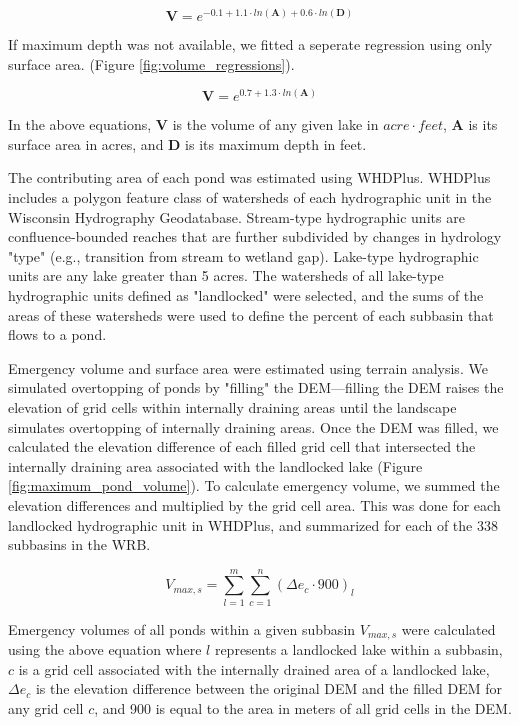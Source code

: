 \begin{equation}
\bm{V} = e^{-0.1 + 1.1 \cdot ln(\bm{A}) + 0.6 \cdot ln(\bm{D})} 
\end{equation}

If maximum depth was not available, we fitted a seperate regression using only surface area. (Figure \ref{fig:volume_regressions}).

\begin{equation}
\bm{V} = e^{0.7 + 1.3 \cdot ln(\bm{A})} 
\end{equation}

In the above equations, $\bm{V}$ is the volume of any given lake in $acre \cdot feet$, $\bm{A}$ is its surface area in acres, and $\bm{D}$ is its maximum depth in feet.

The contributing area of each pond was estimated using WHDPlus. WHDPlus includes a polygon feature class of watersheds of each hydrographic unit in the Wisconsin Hydrography Geodatabase. Stream-type hydrographic units are confluence-bounded reaches that are further subdivided by changes in hydrology "type" (e.g., transition from stream to wetland gap). Lake-type hydrographic units are any lake greater than 5 acres. The watersheds of all lake-type hydrographic units defined as "landlocked" were selected, and the sums of the areas of these watersheds were used to define the percent of each subbasin that flows to a pond.

Emergency volume and surface area were estimated using terrain analysis. We simulated overtopping of ponds by "filling" the DEM---filling the DEM raises the elevation of grid cells within internally draining areas until the landscape simulates overtopping of internally draining areas. Once the DEM was filled, we calculated the elevation difference of each filled grid cell that intersected the internally draining area associated with the landlocked lake (Figure \ref{fig:maximum_pond_volume}). To calculate emergency volume, we summed the elevation differences and multiplied by the grid cell area. This was done for each landlocked hydrographic unit in WHDPlus, and summarized for each of the 338 subbasins in the WRB.

\begin{equation}
V_{max,s} = \sum\limits_{l=1}^m \sum\limits_{c=1}^n (\Delta e_c \cdot 900)_l
\end{equation}

Emergency volumes of all ponds within a given subbasin $V_{max,s}$ were calculated using the above equation where $l$ represents a landlocked lake within a subbasin, $c$ is a grid cell associated with the internally drained area of a landlocked lake, $\Delta e_c$ is the elevation difference between the original DEM and the filled DEM for any grid cell $c$, and 900 is equal to the area in meters of all grid cells in the DEM.